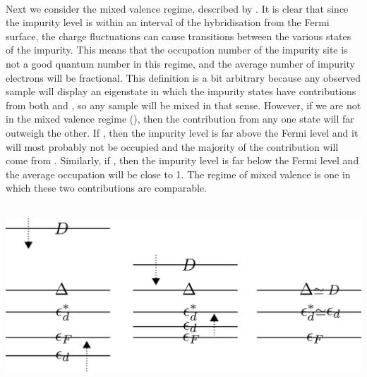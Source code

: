 \documentclass[14pt]{extarticle}
\numberwithin{equation}{section}
\begin{document}
\begin{center}
\begin{minipage}{50pt}
	\\\\
\end{minipage}
\hspace*{20pt}\il{\Longrightarrow}\hspace*{20pt}
\begin{minipage}{50pt}
\\\\
\end{minipage}
\hspace*{20pt}\il{\Longrightarrow}\hspace*{20pt}
\begin{minipage}{50pt}
\\\\
\end{minipage}
\end{center}
Next we consider the mixed valence regime, described by . It is clear that since the impurity level is within an interval of the hybridisation from the Fermi surface, the charge fluctuations can cause transitions between the various states of the impurity. This means that the occupation number of the impurity site is not a good quantum number in this regime, and the average number of impurity electrons will be fractional. This definition is a bit arbitrary because any observed sample will display an eigenstate in which the impurity states have contributions from both  and , so any sample will be mixed in that sense. However, if we are not in the mixed valence regime (), then the contribution from any one state will far outweigh the other. If , then the impurity level is far above the Fermi level and it will most probably not be occupied and the majority of the contribution will come from . Similarly, if , then the impurity level is far below the Fermi level and the average occupation will be close to 1. The regime of mixed valence is one in which these two contributions are comparable. \\\\
\begin{center} \includegraphics[scale=0.29]{mixed.png} \end{center}
\end{document}

